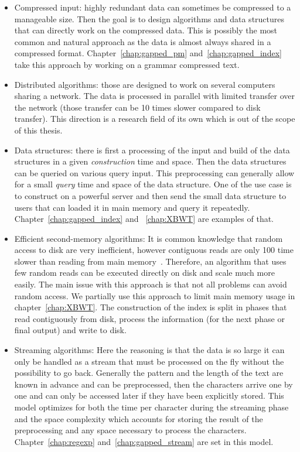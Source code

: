 \begin{itemize}
\item Compressed input: highly redundant data can sometimes be compressed to a manageable size. Then the goal is to design algorithms and data structures that can directly work on the compressed data. This is possibly the most common and natural approach as the data is almost always shared in a compressed format. Chapter~\ref{chap:gapped_pm} and~\ref{chap:gapped_index} take this approach by working on a grammar compressed text.
\item Distributed algorithms: those are designed to work on several computers sharing a network. The data is processed in parallel with limited transfer over the network (those transfer can be 10 times slower compared to disk transfer). This direction is a research field of its own which is out of the scope of this thesis.
\item Data structures: there is first a processing of the input and build of the data structures in a given \emph{construction} time and space. Then the data structures can be queried on various query input. This preprocessing can generally allow for a small \emph{query} time and space of the data structure. One of the use case is to construct on a powerful server and then send the small data structure to users that can loaded it in main memory and query it repeatedly. Chapter~\ref{chap:gapped_index} and ~\ref{chap:XBWT} are examples of that.
\item Efficient second-memory algorithms: It is  common knowledge that random access to disk are very inefficient, however contiguous reads are only 100 time slower than reading from main memory~\cite{navarro2016compact}. Therefore, an algorithm that uses few random reads can be executed directly on disk and scale much more easily. The main issue with this approach is that not all problems can avoid random access. We partially use this approach to limit main memory usage in chapter~\ref{chap:XBWT}. The construction of the index is split in phases that read contiguously from disk, process the information (for the next phase or final output) and write to disk.
\item Streaming algorithms: Here the reasoning is that the data is so large it can only be handled as a stream that must be processed on the fly without the possibility to go back. Generally the pattern and the length of the text are known in advance and can be preprocessed, then the characters arrive one by one and can only be accessed later if they have been explicitly stored. This model optimizes for both the time per character during the streaming phase and the space complexity which accounts for storing the result of the preprocessing and any space necessary to process the characters. Chapter~\ref{chap:regexp} and~\ref{chap:gapped_stream} are set in this model.

\end{itemize}
